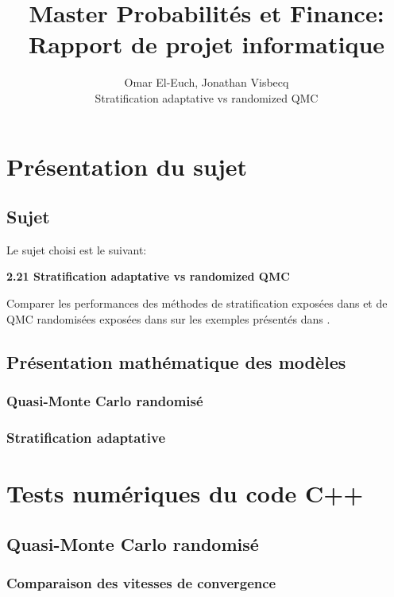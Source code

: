 \documentclass[12pt,a4paper]{report}
\author{Omar El-Euch, Jonathan Visbecq \\ Stratification adaptative vs randomized QMC}
\title{\centering Master Probabilités et Finance: \\ \textbf{Rapport de projet informatique}}
\begin{document}
\maketitle

\tableofcontents

\chapter{Présentation du sujet}

\section{Sujet}
Le sujet choisi est le suivant:
\begin{center}
\bf
	2.21 Stratification adaptative vs randomized QMC
\end{center}


Comparer les performances des méthodes de stratification exposées dans \cite{EJ08} et de QMC randomisées exposées dans \cite{Tu04} sur les exemples présentés dans \cite{EJ08}.


\section{Présentation mathématique des modèles}

\subsection{Quasi-Monte Carlo randomisé}

\subsection{Stratification adaptative}

\chapter{Tests numériques du code C++}

\section{Quasi-Monte Carlo randomisé}

\subsection{Comparaison des vitesses de convergence}
\end{document}

